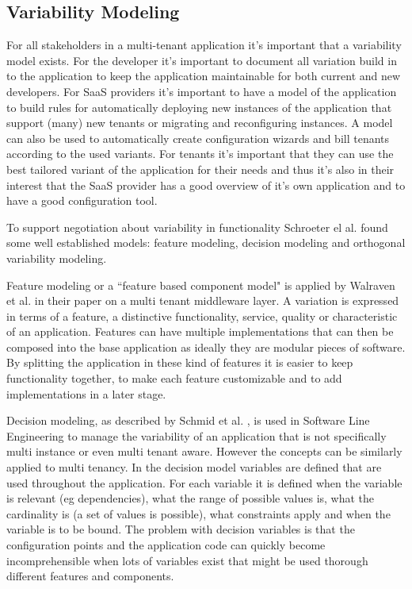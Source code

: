 
\subsection{Variability Modeling}
For all stakeholders in a multi-tenant application it's important that a variability model exists. For the developer it's important to document all variation build in to the application to keep the application maintainable for both current and new developers. 
For SaaS providers it's important to have a model of the application to build rules for automatically deploying new instances of the application that support (many) new tenants or migrating and reconfiguring instances. 
A model can also be used to automatically create configuration wizards and bill tenants according to the used variants. 
For tenants it's important that they can use the best tailored variant of the application for their needs and thus it's also in their interest that the SaaS provider has a good overview of it's own application and to have a good configuration tool.

To support negotiation about variability in functionality Schroeter el al. \cite{schroeter2012towards} found some well established models: feature modeling, decision modeling and orthogonal variability modeling.

Feature modeling or a ``feature based component model" is applied by Walraven et al. \cite{walraven2011middleware} in their paper on a multi tenant middleware layer. A variation is
expressed in terms of a feature, a distinctive functionality, service, quality or characteristic of an 
application. Features can have multiple implementations that can then be composed into the 
base application as ideally they are modular pieces of software. By splitting the application in 
these kind of features it is easier to keep functionality together, to make each feature 
customizable and to add implementations in a later stage.

Decision modeling, as described by Schmid et al. \cite{schmid2004customizable}, is used in 
Software Line Engineering to manage the variability of an application that is not specifically 
multi instance or even multi tenant aware. However the concepts can be similarly applied to 
multi tenancy. In the decision model variables are defined that are used throughout the 
application. For each variable it is defined when the variable is relevant (eg dependencies), 
what the range of possible values is, what the cardinality is (a set of values is possible), what 
constraints apply and when the variable is to be bound. The problem with decision variables is 
that the configuration points and the application code can quickly become incomprehensible 
when lots of variables exist that might be used thorough different features and components.

